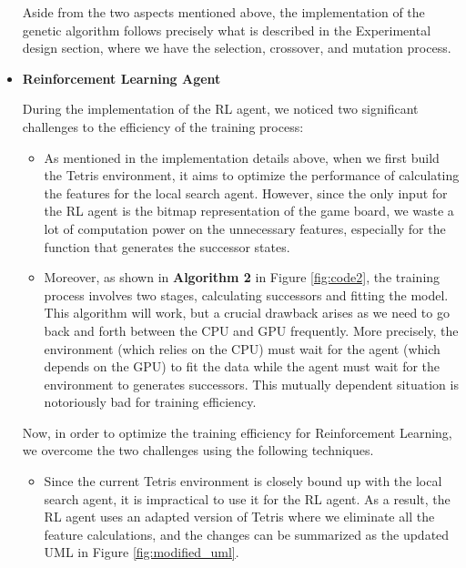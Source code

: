 \documentclass[letterpaper]{article} %
\begin{document}
\begin{itemize}
  Aside from the two aspects mentioned above, the implementation of the genetic algorithm follows precisely what is described in the Experimental design section, where we have the selection, crossover, and mutation process.
   
  \item \textbf{Reinforcement Learning Agent}
  
During the implementation of the RL agent, we noticed two significant challenges to the efficiency of the training process:
\begin{itemize}
  \item 
  As mentioned in the implementation details above, when we first build the Tetris environment, it aims to optimize the performance of calculating the features for the local search agent. However, since the only input for the RL agent is the bitmap representation of the game board, we waste a lot of computation power on the unnecessary features, especially for the function that generates the successor states.
  \item 
  Moreover, as shown in {\bf Algorithm 2} in Figure \ref{fig:code2}, the training process involves two stages, calculating successors and fitting the model. This algorithm will work, but a crucial drawback arises as we need to go back and forth between the CPU and GPU frequently. More precisely, the environment (which relies on the CPU) must wait for the agent (which depends on the GPU) to fit the data while the agent must wait for the environment to generates successors. This mutually dependent situation is notoriously bad for training efficiency.
\end{itemize}
Now, in order to optimize the training efficiency for Reinforcement Learning, we overcome the two challenges using the following techniques.
\begin{itemize}
  \item 
  Since the current Tetris environment is closely bound up with the local search agent, it is impractical to use it for the RL agent. As a result, the RL agent uses an adapted version of Tetris where we eliminate all the feature calculations, and the changes can be summarized as the updated UML in Figure \ref{fig:modified_uml}.


\end{itemize}
\end{itemize}
\end{document}
